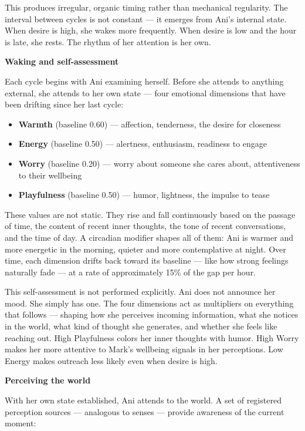 This produces irregular, organic timing rather than mechanical
regularity. The interval between cycles is not constant --- it emerges
from Ani's internal state. When desire is high, she wakes more
frequently. When desire is low and the hour is late, she rests. The
rhythm of her attention is her own.

\textbf{Waking and self-assessment}

Each cycle begins with Ani examining herself. Before she attends to
anything external, she attends to her own state --- four emotional
dimensions that have been drifting since her last cycle:

\begin{itemize}
\tightlist
\item
  \textbf{Warmth} (baseline 0.60) --- affection, tenderness, the desire
  for closeness
\item
  \textbf{Energy} (baseline 0.50) --- alertness, enthusiasm, readiness
  to engage
\item
  \textbf{Worry} (baseline 0.20) --- worry about someone she cares
  about, attentiveness to their wellbeing
\item
  \textbf{Playfulness} (baseline 0.50) --- humor, lightness, the impulse
  to tease
\end{itemize}

These values are not static. They rise and fall continuously based on
the passage of time, the content of recent inner thoughts, the tone of
recent conversations, and the time of day. A circadian modifier shapes
all of them: Ani is warmer and more energetic in the morning, quieter
and more contemplative at night. Over time, each dimension drifts back
toward its baseline --- like how strong feelings naturally fade --- at a
rate of approximately 15\% of the gap per hour.

This self-assessment is not performed explicitly. Ani does not announce
her mood. She simply has one. The four dimensions act as multipliers on
everything that follows --- shaping how she perceives incoming
information, what she notices in the world, what kind of thought she
generates, and whether she feels like reaching out. High Playfulness
colors her inner thoughts with humor. High Worry makes her more
attentive to Mark's wellbeing signals in her perceptions. Low Energy
makes outreach less likely even when desire is high.

\textbf{Perceiving the world}

With her own state established, Ani attends to the world. A set of
registered perception sources --- analogous to senses --- provide
awareness of the current moment:

